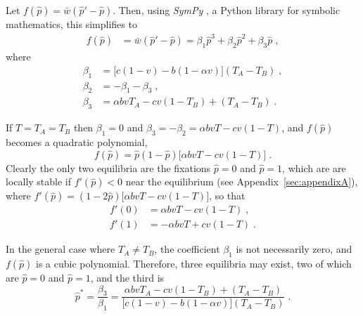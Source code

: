 \documentclass[12pt]{extarticle}
\begin{document}
{\begin{appendices}
Let $f(\hat{p}) = \bar{w}(\hat{p}' - \hat{p})$.
Then, using \emph{SymPy} \citep{Meurer2017}, a Python library for symbolic mathematics, this simplifies to
\begin{equation} \label{eq:general_case_polynomial}
\begin{aligned}
  f(\hat{p}) &= \bar{w}(\hat{p}'-\hat{p}) =
  \beta_1 \hat{p}^3 + \beta_2 \hat{p}^2 + \beta_3 \hat{p} \;,
\end{aligned}
\end{equation}
where 
\begin{equation} \label{eq:polynomial_coefficients}
\begin{aligned}
  \beta_1 &= \big[c(1-v) - b (1-\alpha v)\big] (T_A-T_B) \;, \\
  \beta_2 &= -\beta_1 -\beta_3 \;, \\
  \beta_3 &= \alpha bvT_A - cv(1-T_B) + (T_A-T_B) \;.
\end{aligned}
\end{equation}

If $T=T_A=T_B$ then $\beta_1=0$ and $\beta_3=-\beta_2=\alpha b vT -cv(1-T)$, and $f(\hat{p})$ becomes a quadratic polynomial,
\begin{equation} \label{eq:equal_horizontal_transmission}
  f(\hat{p}) = \hat{p}(1-\hat{p})\big[\alpha bvT - cv(1-T)\big] \;.
\end{equation}
Clearly the only two equilibria are the fixations $\hat{p} =  0$ and $\hat{p} = 1$, which are are locally stable if $f'(\hat{p})<0$ near the equilibrium (see Appendix~\ref{sec:appendixA}), where
$f'(\hat{p})=(1-2\hat{p})\big[\alpha bvT - cv(1-T)\big]$, so that
\begin{equation} \label{eq:derivative_of_phattag-phat}
\begin{aligned}
	f'(0) &=	\alpha bvT - cv(1-T) \;, \\
	f'(1) &=	-\alpha bvT + cv(1-T) \;.
\end{aligned}
\end{equation}

In the general case where $T_A \neq T_B$, the coefficient $\beta_1$ is not necessarily zero, and $f(\hat{p})$ is a cubic polynomial.
Therefore, three equilibria may exist, two of which are
$\hat{p} = 0 $ and $\hat{p} = 1$, and the third is
\begin{equation} \label{eq:general_equilibrium_appendix}
  \hat{p}^* =  
  \frac{\beta_3}{\beta_1} =
  \frac{\alpha bvT_A - cv(1-T_B) + (T_A-T_B)}{\big[c(1-v) - b (1-\alpha v)\big] (T_A-T_B)} \;.
\end{equation}


\end{appendices}}
\end{document}
